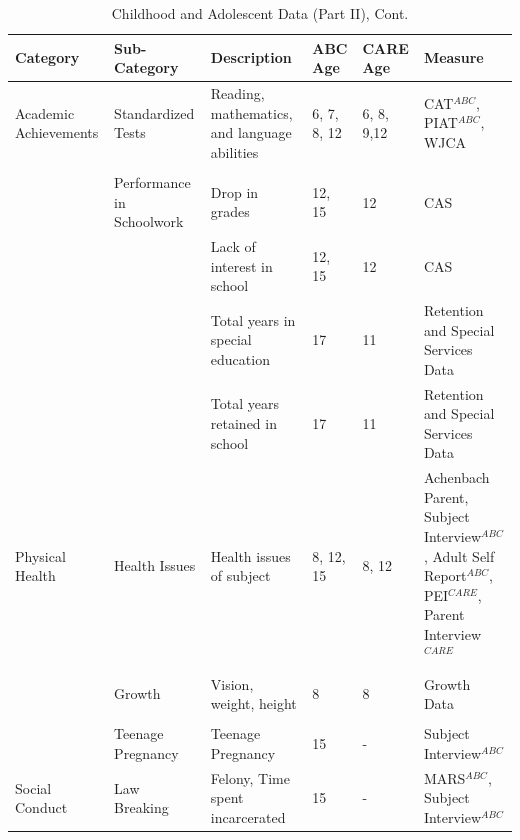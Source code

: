 \documentclass[static]{JJH-Beamer}
\begin{document}
\begin{frame}

\begin{table}[H]
\addtocounter{table}{-1}
\caption{Childhood and Adolescent Data (Part II), Cont.}
\begin{center}
\begin{tiny}
\begin{tabular}{L{1.2cm} C{1.4cm} C{2.5cm} C{.9cm} C{.8cm} C{2.9cm}}
\toprule
\textbf{Category}	&	\textbf{Sub-Category}	&	\textbf{Description}	&	\textbf{ABC Age}  	&  \textbf{CARE Age}  & 	\textbf{Measure}	\\ \midrule
Academic Achievements	&	Standardized Tests	&	Reading, mathematics, and language abilities	&	6, 7, 8, 12	&	6, 8, 9,12	&	CAT$^{ABC}$, PIAT$^{ABC}$, WJCA	\\
		&	\\
	&	Performance in Schoolwork	&	Drop in grades	&	12, 15		&	12	&	CAS	\\
	&		&	Lack of interest in school	&	12, 15		&	12	&	CAS	\\
	&		&  Total years in special education & 17 & 11 & Retention and Special Services Data \\
	&		&  Total years retained in school & 17 & 11 & Retention and Special Services Data \\  \midrule
Physical Health	&	Health Issues	&	Health issues of subject	&	8, 12, 15	&	8, 12	&	Achenbach Parent, Subject Interview$^{ABC}$, Adult Self Report$^{ABC}$, PEI$^{CARE}$, Parent Interview$^{CARE}$	\\
	&	\\
	&	Growth	&	Vision, weight, height	&	8	&	8	&	Growth Data	\\
	&	\\
	&	Teenage Pregnancy	&	Teenage Pregnancy	&	15	&	- 	& Subject Interview$^{ABC}$		\\ \midrule
Social Conduct	&	Law Breaking	&	Felony, Time spent incarcerated	&	15	&	- 	&	MARS$^{ABC}$, Subject Interview$^{ABC}$	\\ \bottomrule
\end{tabular}
\end{tiny}
\end{center}
\end{table}

\end{frame}
\end{document}
